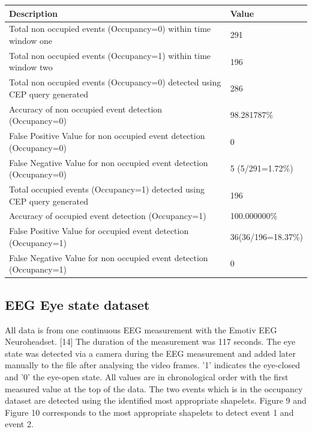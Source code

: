 \documentclass[letterpaper, 10 pt, conference]{IEEEtran}  %
\begin{document}
\begin{center}
\begin{tabular}{ | m{6cm} | m{2.3cm}| } 
 \hline 
\textbf{Description} & \textbf{Value}\\
\hline
Total non occupied events (Occupancy=0) within time window one & 291\\
\hline
Total non occupied events (Occupancy=1) within time window two & 196 \\
\hline
Total non occupied events (Occupancy=0) detected using CEP query generated & 286\\
\hline
Accuracy of non occupied event detection (Occupancy=0) & 98.281787\%\\
\hline
False Positive Value for non occupied event detection (Occupancy=0) & 0\\
\hline
False Negative Value for non occupied event detection (Occupancy=0) & 5 \newline(5/291=1.72\%)\\
\hline
Total occupied events (Occupancy=1) detected using CEP query generated & 196\\ 
 \hline
Accuracy of occupied event detection (Occupancy=1) & 100.000000\%\\
\hline
False Positive Value for occupied event detection (Occupancy=1) & 36\newline(36/196=18.37\%)\\
\hline
False Negative Value for non occupied event detection (Occupancy=1) & 0\\
\hline

\end{tabular}
\end{center}

\subsection{EEG Eye state dataset}
All data is from one continuous EEG measurement with the Emotiv EEG Neuroheadset. [14] The duration of the measurement was 117 seconds. The eye state was detected via a camera during the EEG measurement and added later manually to the file after analysing the video frames. '1' indicates the eye-closed and '0' the eye-open state. All values are in chronological order with the first measured value at the top of the data. The two events which is in the occupancy dataset are detected using the identified most appropriate shapelets. Figure 9 and Figure 10 corresponds to the most appropriate shapelets to detect event 1 and event 2.
\end{document}
